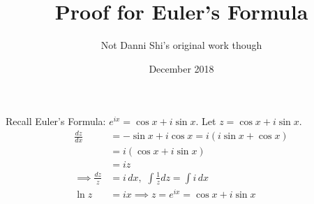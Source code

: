 \documentclass[11pt,letterpaper]{article}
\title{Proof for Euler's Formula}
\author{Not Danni Shi's original work though}
\date{December 2018}
\begin{document}
\maketitle
\noindent Recall Euler's Formula: $e^{ix} = \cos x + i\sin x$. Let $z = \cos x + i\sin x$.
\begin{align*}
\frac{dz}{dx} &= -\sin x + i\cos x = i(i\sin x + \cos x) \\
&= i(\cos x + i\sin x)\\
&= iz\\
\implies \frac{dz}{z} &= i \, dx, \,\, \int \frac{1}{z} dz = \int i \, dx\\
\ln z &= ix \implies z = e^{ix} = \cos x + i\sin x
\end{align*}
\end{document}

